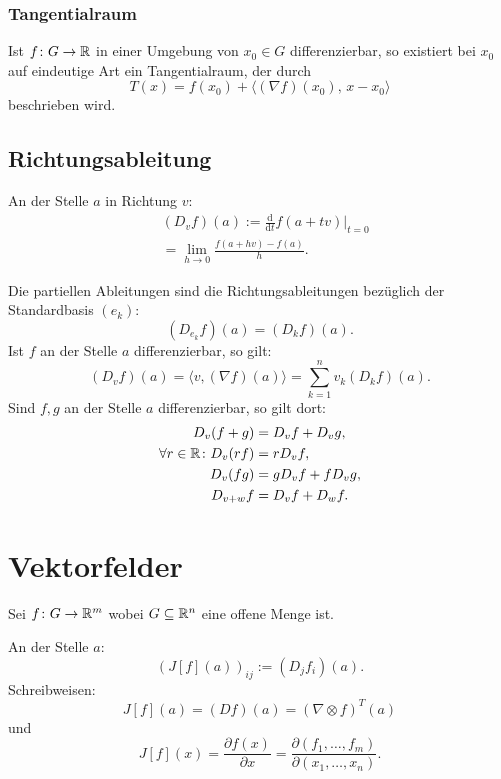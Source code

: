 \subsubsection{Tangentialraum}
Ist $f\colon G\to\mathbb R$ in einer Umgebung von $x_0\in G$
differenzierbar, so existiert bei $x_0$ auf eindeutige Art
ein Tangentialraum, der durch
\begin{equation}
T(x) = f(x_0)+\langle(\nabla f)(x_0),\,x-x_0\rangle
\end{equation}
beschrieben wird.

\subsection{Richtungsableitung}
\begin{definition}[Richtungsableitung]\mbox{}\newline
An der Stelle $a$ in Richtung $v$:
\begin{equation}
\begin{split}
& (D_v f)(a) := \frac{\mathrm d}{\mathrm dt} f(a+tv)\Big|_{t=0}\\
& = \lim_{h\to 0} \frac{f(a+hv)-f(a)}{h}.
\end{split}
\end{equation}
\end{definition}
\noindent
Die partiellen Ableitungen sind die Richtungsableitungen
bezüglich der Standardbasis $(e_k)$:
\begin{equation}
(D_{\displaystyle e_k}f)(a) = (D_k f)(a).
\end{equation}
Ist $f$ an der Stelle $a$ differenzierbar, so gilt:
\begin{equation}
(D_v f)(a) = \langle v,(\nabla f)(a)\rangle
= \sum_{k=1}^n v_k (D_k f)(a).
\end{equation}
Sind $f,g$ an der Stelle $a$ differenzierbar, so gilt dort:
\begin{align}
D_v (f+g) &= D_v f+D_v g,\\
\forall r\in\mathbb R\colon D_v (rf) &= rD_v f,\\
D_v (fg) &= gD_v f+fD_v g,\\
D_{v+w} f &= D_v f+D_w f.
\end{align}

\section{Vektorfelder}
Sei $f\colon G\to\mathbb R^m$ wobei $G\subseteq\mathbb R^n$ eine offene Menge ist.
\begin{definition}\mbox{}\newline
An der Stelle $a$:
\begin{equation}
(J[f](a))_{ij} := (D_j f_i)(a).
\end{equation}
Schreibweisen:
\begin{equation}
J[f](a) = (Df)(a) = (\nabla\otimes f)^T(a)
\end{equation}
und
\begin{equation}
J[f](x) = \frac{\partial f(x)}{\partial x}
= \frac{\partial(f_1,\ldots,f_m)}{\partial(x_1,\ldots,x_n)}.
\end{equation}
\end{definition}

